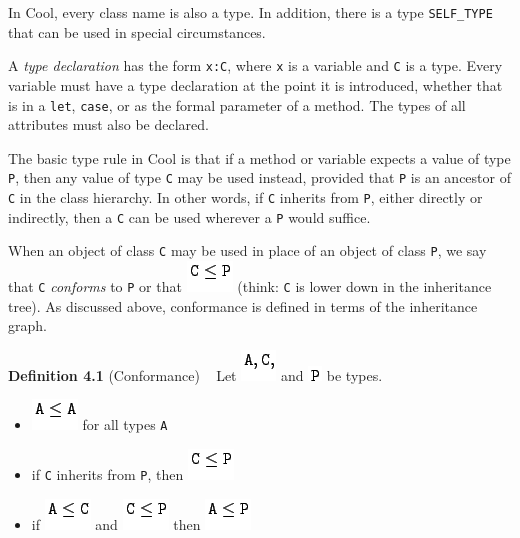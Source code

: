 \documentclass[]{article}
\begin{document}
In Cool, every class name is also a type. In addition, there is a type
\texttt{SELF\_TYPE} that can be used in special circumstances.

A \emph{type declaration} has the form \texttt{x:C}, where \texttt{x} is
a variable and \texttt{C} is a type. Every variable must have a type
declaration at the point it is introduced, whether that is in a
\texttt{let}, \texttt{case}, or as the formal parameter of a method. The
types of all attributes must also be declared.

The basic type rule in Cool is that if a method or variable expects a
value of type \texttt{P}, then any value of type \texttt{C} may be used
instead, provided that \texttt{P} is an ancestor of \texttt{C} in the
class hierarchy. In other words, if \texttt{C} inherits from \texttt{P},
either directly or indirectly, then a \texttt{C} can be used wherever a
\texttt{P} would suffice.

When an object of class \texttt{C} may be used in place of an object of
class \texttt{P}, we say that \texttt{C} \emph{conforms} to \texttt{P}
or that \includegraphics{img1.png} (think: \texttt{C} is lower down in
the inheritance tree). As discussed above, conformance is defined in
terms of the inheritance graph.

\textbf{Definition 4.1} (Conformance) ~ Let \includegraphics{img2.png}
and \includegraphics{img3.png} be types.

\begin{itemize}
\itemsep1pt\parskip0pt
\item
  \includegraphics{img4.png} for all types \texttt{A}
\item
  if \texttt{C} inherits from \texttt{P}, then
  \includegraphics{img1.png}
\item
  if \includegraphics{img5.png} and \includegraphics{img1.png} then
  \includegraphics{img6.png}
\end{itemize}
\end{document}
